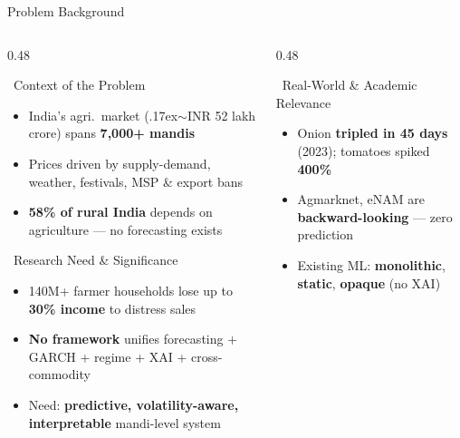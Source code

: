 \documentclass{beamer}
\begin{document}
\begin{frame}[label=bg]{Problem Background}

\begin{columns}[T]
\begin{column}{0.48\textwidth}

\begin{infocard}{~Context of the Problem}
\scriptsize
\begin{itemize}\setlength\itemsep{1pt}
  \item India's agri.\ market ({\raise.17ex\hbox{$\scriptstyle\sim$}}INR 52 lakh crore) spans \textbf{7,000+ mandis}
  \item Prices driven by supply-demand, weather, festivals, MSP \& export bans
  \item \textbf{58\% of rural India} depends on agriculture --- no forecasting exists
\end{itemize}
\end{infocard}

\vspace{0.08cm}

\begin{alertcard}{~Research Need \& Significance}
\scriptsize
\begin{itemize}\setlength\itemsep{1pt}
  \item 140M+ farmer households lose up to \textbf{30\% income} to distress sales
  \item \textbf{No framework} unifies forecasting + GARCH + regime + XAI + cross-commodity
  \item Need: \textbf{predictive, volatility-aware, interpretable} mandi-level system
\end{itemize}
\end{alertcard}

\end{column}
\begin{column}{0.48\textwidth}

\begin{purplecard}{~Real-World \& Academic Relevance}
\scriptsize
\begin{itemize}\setlength\itemsep{1pt}
  \item Onion \textbf{tripled in 45 days} (2023); tomatoes spiked \textbf{400\%}
  \item Agmarknet, eNAM are \textbf{backward-looking} --- zero prediction
  \item Existing ML: \textbf{monolithic}, \textbf{static}, \textbf{opaque} (no XAI)
\end{itemize}
\end{purplecard}


\end{column}
\end{columns}
\end{frame}
\end{document}
